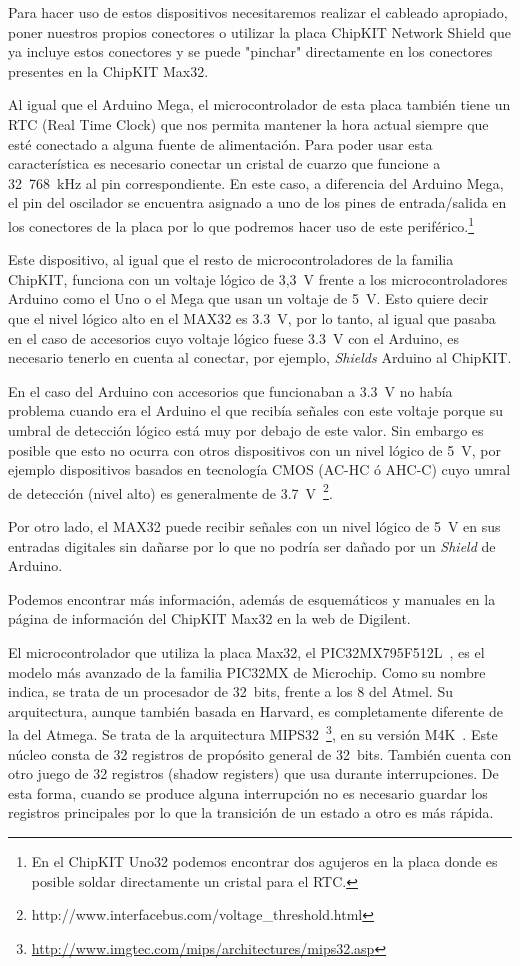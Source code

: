 Para hacer uso de estos dispositivos necesitaremos realizar el cableado apropiado, poner nuestros propios conectores o utilizar la placa ChipKIT Network Shield que ya incluye estos conectores y se puede "pinchar" directamente en los conectores presentes en la ChipKIT Max32. 

Al igual que el Arduino Mega, el microcontrolador de esta placa también tiene un RTC (Real Time Clock) que nos permita mantener la hora actual siempre que esté conectado a alguna fuente de alimentación. Para poder usar esta característica es necesario conectar un cristal de cuarzo que funcione a 32~768~kHz al pin correspondiente. En este caso, a diferencia del Arduino Mega, el pin del oscilador se encuentra asignado a uno de los pines de entrada/salida en los conectores de la placa por lo que podremos hacer uso de este periférico.\footnote{En el ChipKIT Uno32 podemos encontrar dos agujeros en la placa donde es posible soldar directamente un cristal para el RTC.}

Este dispositivo, al igual que el resto de microcontroladores de la familia ChipKIT, funciona con un voltaje lógico de 3,3~V frente a los microcontroladores Arduino como el Uno o el Mega que usan un voltaje de 5~V. Esto quiere decir que el nivel lógico alto en el MAX32 es 3.3~V, por lo tanto, al igual que pasaba en el caso de accesorios cuyo voltaje lógico fuese 3.3~V con el Arduino, es necesario tenerlo en cuenta al conectar, por ejemplo, \textit{Shields} Arduino al ChipKIT.

En el caso del Arduino con accesorios que funcionaban a 3.3~V no había problema cuando era el Arduino el que recibía señales con este voltaje porque su umbral de detección lógico está muy por debajo de este valor. Sin embargo es posible que esto no ocurra con otros dispositivos con un nivel lógico de 5~V, por ejemplo dispositivos basados en tecnología CMOS (AC-HC ó AHC-C) cuyo umral de detección (nivel alto) es generalmente de 3.7~V~\footnote{http://www.interfacebus.com/voltage\_threshold.html}.

Por otro lado, el MAX32 puede recibir señales con un nivel lógico de 5~V en sus entradas digitales sin dañarse por lo que no podría ser dañado por un \textit{Shield} de Arduino.

Podemos encontrar más información, además de esquemáticos y manuales en la página de información del ChipKIT Max32 en la web de Digilent.\cite{website:max32}

El microcontrolador que utiliza la placa Max32, el PIC32MX795F512L~\cite{website:pic32mx}, es el modelo más avanzado de la familia PIC32MX de Microchip. Como su nombre indica, se trata de un procesador de 32~bits, frente a los 8 del Atmel. Su arquitectura, aunque también basada en Harvard, es completamente diferente de la del Atmega. Se trata de la arquitectura MIPS32~\footnote{\url{http://www.imgtec.com/mips/architectures/mips32.asp}}, en su versión M4K~\cite{website:m4k_analysis}. Este núcleo consta de 32 registros de propósito general de 32~bits. También cuenta con otro juego de 32 registros (shadow registers) que usa durante interrupciones. De esta forma, cuando se produce alguna interrupción no es necesario guardar los registros principales por lo que la transición de un estado a otro es más rápida.

